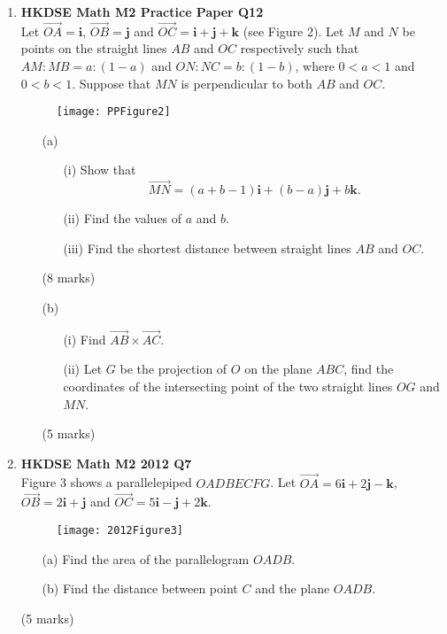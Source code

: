 \documentclass[12pt]{article}
\begin{document}
\begin{enumerate}
	\item \textbf{HKDSE Math M2 Practice Paper Q12}\\
	Let $\overrightarrow{OA} = \textbf{i}$, $\overrightarrow{OB} = \textbf{j}$ and $\overrightarrow{OC} = \textbf{i} + \textbf{j} + \textbf{k}$ (see Figure 2). Let $M$ and $N$ be points on the straight lines $AB$ and $OC$ respectively such that $AM:MB = a:(1-a)$ and $ON:NC = b:(1-b)$, where $0 < a < 1$ and $0 < b < 1$. Suppose that $MN$ is perpendicular to both $AB$ and $OC$.
	\begin{figure}[H]
		\centering
		\texttt{[image: PPFigure2]}
	\end{figure}
	\begin{enumerate}
		\item [(a)]
		\begin{enumerate}
			\item [(i)]Show that $$\overrightarrow{MN} = (a+b-1)\textbf{i} +(b-a) \textbf{j} +b \textbf{k}.$$
			\item [(ii)]Find the values of $a$ and $b$.
			\item [(iii)]Find the shortest distance between straight lines $AB$ and $OC$.
		\end{enumerate}
		(8 marks)
		\item [(b)]
		\begin{enumerate}
			\item [(i)]Find $\overrightarrow{AB}\times\overrightarrow{AC}$. 
			\item [(ii)]Let $G$ be the projection of $O$ on the plane $ABC$, find the coordinates of the intersecting point of the two straight lines $OG$ and $MN$.
		\end{enumerate}
		(5 marks)    
  	\end{enumerate}
	
	\newpage
	
	\item \textbf{HKDSE Math M2 2012 Q7}\\
	Figure 3 shows a parallelepiped $OADBECFG$. Let $\overrightarrow{OA} = 6\textbf{i} +2\textbf{j} -\textbf{k}$, $\overrightarrow{OB} = 2\textbf{i} +\textbf{j} $ and $\overrightarrow{OC} = 5\textbf{i} -\textbf{j} +2\textbf{k}$.
	\begin{figure}[H]
		\centering
		\texttt{[image: 2012Figure3]}
	\end{figure}
	\begin{enumerate}
		\item [(a)]Find the area of the parallelogram $OADB$. 
		\item [(b)]Find the distance between point $C$ and the plane $OADB$.
	\end{enumerate}
	(5 marks)


\end{enumerate}
\end{document}
